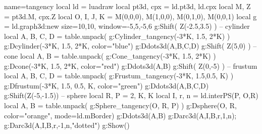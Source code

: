 \begin{luadraw}{name=tangency}
local ld = luadraw
local pt3d, cpx = ld.pt3d, ld.cpx
local M, Z = pt3d.M, cpx.Z
local O, I, J, K = M(0,0,0), M(1,0,0), M(0,1,0), M(0,0,1)
local g = ld.graph3d:new{ size={10,10}, window={-5,5,-5,6} }
g:Shift( Z(-2.5,3.5) ) -- cylinder
local A, B, C, D = table.unpack( g:Cylinder_tangency(-3*K, 1.5, 2*K) )
g:Dcylinder(-3*K, 1.5, 2*K, {color="blue"})
g:Ddots3d({A,B,C,D})
g:Shift( Z(5,0) ) -- cone
local A, B = table.unpack( g:Cone_tangency(-3*K, 1.5, 2*K) )
g:Dcone(-3*K, 1.5, 2*K, {color="red"})
g:Ddots3d({A,B})
g:Shift( Z(0,-5) ) -- frustum
local A, B, C, D = table.unpack( g:Frustum_tangency(-3*K, 1.5,0.5, K) )
g:Dfrustum(-3*K, 1.5, 0.5, K, {color="green"})
g:Ddots3d({A,B,C,D})
g:Shift(Z(-5,-1.5)) -- sphere
local R, P = 2, {K, K}
local I, r, n = ld.interPS(P, {O,R})
local A, B = table.unpack( g:Sphere_tangency(O, R, P) )
g:Dsphere(O, R, {color="orange", mode=ld.mBorder})
g:Ddots3d({A,B})
g:Darc3d(A,I,B,r,1,n); g:Darc3d(A,I,B,r,-1,n,"dotted")
g:Show()
\end{luadraw}
